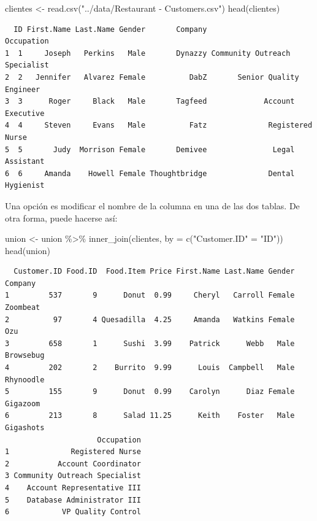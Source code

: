 \documentclass[
  letterpaper,
  DIV=11,
  numbers=noendperiod]{scrreprt}
\newenvironment{Shaded}{\begin{snugshade}}{\end{snugshade}}
\newcommand{\AttributeTok}[1]{\textcolor[rgb]{0.40,0.45,0.13}{#1}}
\newcommand{\FunctionTok}[1]{\textcolor[rgb]{0.28,0.35,0.67}{#1}}
\newcommand{\NormalTok}[1]{\textcolor[rgb]{0.00,0.23,0.31}{#1}}
\newcommand{\OtherTok}[1]{\textcolor[rgb]{0.00,0.23,0.31}{#1}}
\newcommand{\SpecialCharTok}[1]{\textcolor[rgb]{0.37,0.37,0.37}{#1}}
\newcommand{\StringTok}[1]{\textcolor[rgb]{0.13,0.47,0.30}{#1}}
\begin{document}
\begin{Shaded}
\begin{Highlighting}[]
\NormalTok{clientes }\OtherTok{\textless{}{-}} \FunctionTok{read.csv}\NormalTok{(}\StringTok{"../data/Restaurant {-} Customers.csv"}\NormalTok{)}
\FunctionTok{head}\NormalTok{(clientes)}
\end{Highlighting}
\end{Shaded}

\begin{verbatim}
  ID First.Name Last.Name Gender       Company                    Occupation
1  1     Joseph   Perkins   Male       Dynazzy Community Outreach Specialist
2  2   Jennifer   Alvarez Female          DabZ       Senior Quality Engineer
3  3      Roger     Black   Male       Tagfeed             Account Executive
4  4     Steven     Evans   Male          Fatz              Registered Nurse
5  5       Judy  Morrison Female       Demivee               Legal Assistant
6  6     Amanda    Howell Female Thoughtbridge              Dental Hygienist
\end{verbatim}

Una opción es modificar el nombre de la columna en una de las dos
tablas. De otra forma, puede hacerse así:

\begin{Shaded}
\begin{Highlighting}[]
\NormalTok{union }\OtherTok{\textless{}{-}}\NormalTok{ union }\SpecialCharTok{\%\textgreater{}\%} \FunctionTok{inner\_join}\NormalTok{(clientes, }\AttributeTok{by =} \FunctionTok{c}\NormalTok{(}\StringTok{"Customer.ID"} \OtherTok{=} \StringTok{"ID"}\NormalTok{))}
\FunctionTok{head}\NormalTok{(union)}
\end{Highlighting}
\end{Shaded}

\begin{verbatim}
  Customer.ID Food.ID  Food.Item Price First.Name Last.Name Gender   Company
1         537       9      Donut  0.99     Cheryl   Carroll Female  Zoombeat
2          97       4 Quesadilla  4.25     Amanda   Watkins Female       Ozu
3         658       1      Sushi  3.99    Patrick      Webb   Male Browsebug
4         202       2    Burrito  9.99      Louis  Campbell   Male Rhynoodle
5         155       9      Donut  0.99    Carolyn      Diaz Female  Gigazoom
6         213       8      Salad 11.25      Keith    Foster   Male Gigashots
                     Occupation
1              Registered Nurse
2           Account Coordinator
3 Community Outreach Specialist
4    Account Representative III
5    Database Administrator III
6            VP Quality Control
\end{verbatim}
\end{document}
